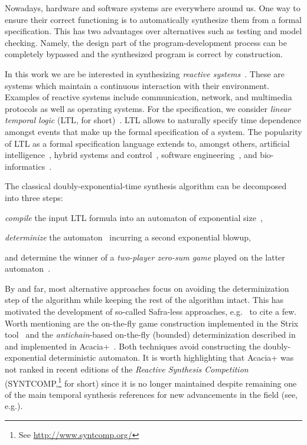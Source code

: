 Nowadays, hardware and software systems are everywhere around us. One way to
ensure their correct functioning is to automatically synthesize them from a
formal specification.  This has two advantages over alternatives such as
testing and model checking.  Namely, the design part of the
program-development process can be completely bypassed and the synthesized
program is correct by construction.

In this work we are be interested in synthesizing \emph{reactive
systems}~\cite{hp84}. These are systems which maintain a continuous
interaction with their environment.  Examples of reactive systems include
communication, network, and multimedia protocols as well as operating systems.
For the specification, we consider \emph{linear temporal logic} (LTL, for
short)~\cite{pnueli77}. LTL allows to naturally specify time dependence
amongst events that make up the formal specification of a system. The
popularity of LTL as a formal specification language extends to, amongst
others, artificial intelligence~\cite{gv16,cm19,gnpw20}, hybrid systems and
control~\cite{bvpyb16}, software engineering~\cite{lpb15}, and
bio-informatics~\cite{abbdfhinprs17}.

The
classical doubly-exponential-time synthesis algorithm can be decomposed
into three steps:
\begin{enumerate*}[label={(\roman*)}]
  \item \emph{compile} the input LTL formula into an automaton of exponential
    size~\cite{vw84},
  \item \emph{determinize} the automaton~\cite{safra88,piterman07} incurring a
    second exponential blowup,
  \item and determine the winner of a \emph{two-player zero-sum game} played
    on the latter automaton~\cite{pr89}.
\end{enumerate*}
By and far, most alternative approaches focus on avoiding the determinization
step of the algorithm while keeping the rest of the algorithm intact.  This
has motivated the development of so-called Safra-less approaches,
e.g.~\cite{kpv06,eks16,ekrs17,tushy17} to cite a few.  Worth mentioning are
the on-the-fly game construction implemented in the Strix tool~\cite{msl18}
and the \emph{antichain}-based on-the-fly (bounded) determinization described
in~\cite{fjr09} and implemented in Acacia+~\cite{bbfjr12}. Both techniques
avoid constructing the doubly-exponential deterministic automaton.  It is
worth highlighting that Acacia+ was not ranked in recent editions of the
\emph{Reactive Synthesis Competition} (SYNTCOMP,\footnote{See
\url{http://www.syntcomp.org/}} for short) since it is no longer maintained
despite remaining one of the main temporal synthesis references for new
advancements in the field (see,
e.g.\cite{ffrt17,ztlpv17,apsec20,lms20,bltv20}).

